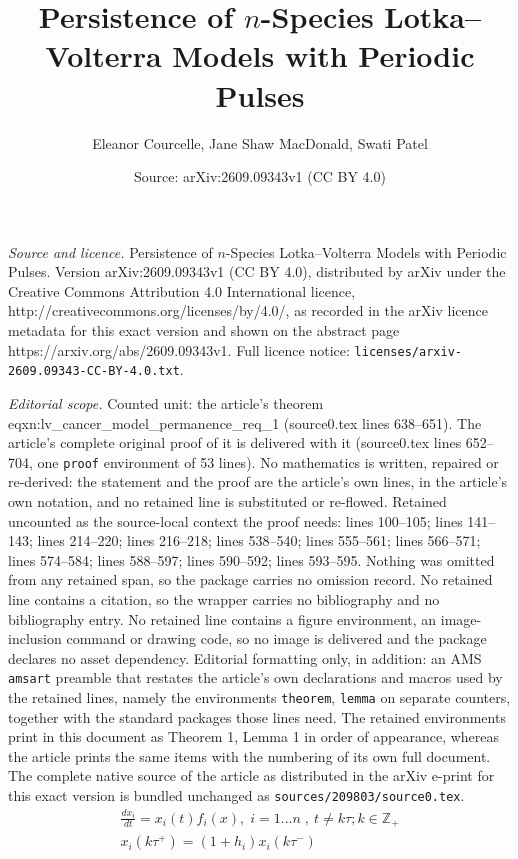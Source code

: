 \documentclass[10pt,a4paper]{amsart}
\title{Persistence of \(n\)-Species Lotka--Volterra Models with Periodic Pulses}
\author{Eleanor Courcelle, Jane Shaw MacDonald, Swati Patel}
\date{Source: arXiv:2609.09343v1 (CC BY 4.0)}
\newcommand{\Z}{{\mathbb{Z}}}
\begin{document}
\maketitle

\noindent\emph{Source and licence.} Persistence of \(n\)-Species Lotka--Volterra Models with Periodic Pulses. Version arXiv:2609.09343v1 (CC BY 4.0), distributed by arXiv under the Creative Commons Attribution 4.0 International licence, http://creativecommons.org/licenses/by/4.0/, as recorded in the arXiv licence metadata for this exact version and shown on the abstract page https://arxiv.org/abs/2609.09343v1. Full licence notice: \texttt{licenses/arxiv-2609.09343-CC-BY-4.0.txt}.\par\smallskip

\noindent\textit{Editorial scope.} Counted unit: the article's theorem eqxn:lv\_cancer\_model\_permanence\_req\_1 (source0.tex lines 638--651). The article's complete original proof of it is delivered with it (source0.tex lines 652--704, one \texttt{proof} environment of 53 lines). No mathematics is written, repaired or re-derived: the statement and the proof are the article's own lines, in the article's own notation, and no retained line is substituted or re-flowed.  Retained uncounted as the source-local context the proof needs: lines 100--105; lines 141--143; lines 214--220; lines 216--218; lines 538--540; lines 555--561; lines 566--571; lines 574--584; lines 588--597; lines 590--592; lines 593--595.  Nothing was omitted from any retained span, so the package carries no omission record.  No retained line contains a citation, so the wrapper carries no bibliography and no bibliography entry.  No retained line contains a figure environment, an image-inclusion command or drawing code, so no image is delivered and the package declares no asset dependency.  Editorial formatting only, in addition: an AMS \texttt{amsart} preamble that restates the article's own declarations and macros used by the retained lines, namely the environments \texttt{theorem}, \texttt{lemma} on separate counters, together with the standard packages those lines need.  The retained environments print in this document as Theorem 1, Lemma 1 in order of appearance, whereas the article prints the same items with the numbering of its own full document.  The complete native source of the article as distributed in the arXiv e-print for this exact version is bundled unchanged as \texttt{sources/209803/source0.tex}.
\begin{equation} \label{eqxn:pulsed_model}
    \begin{split}
        \frac{dx_i}{dt} = x_i(t) f_i(x) ,\;  i = 1 \ldots n\; ,\ t \neq k\tau; k \in \Z_{+}\\
        x_i(k\tau^+) = (1+h_i)x_i(k\tau^-)
    \end{split}
\end{equation}
\end{document}
